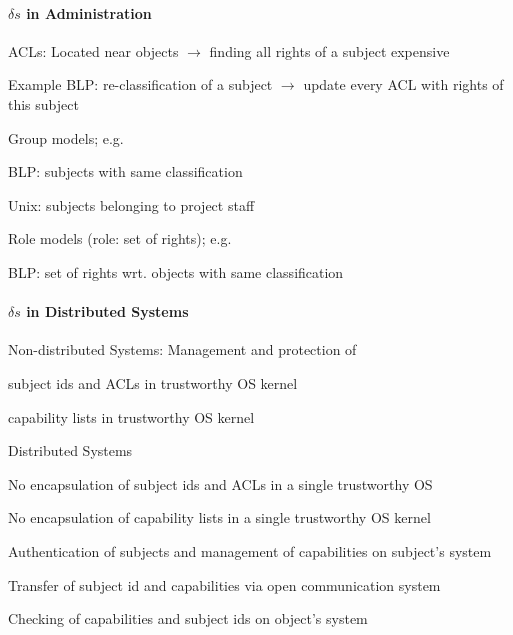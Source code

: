\documentclass[a4paper]{article}
\begin{document}
\begin{multicols}{3}
    \paragraph{$\delta s$ in Administration}
    ACLs: Located near objects $\rightarrow$ finding all rights of a subject expensive

    Example BLP: re-classification of a subject $\rightarrow$ update every ACL with rights of this subject

    Group models; e.g.
    \begin{itemize*}
        \item BLP: subjects with same classification
        \item Unix: subjects belonging to project staff
    \end{itemize*}

    Role models (role: set of rights); e.g.
    \begin{itemize*}
        \item BLP: set of rights wrt. objects with same classification
    \end{itemize*}

    \paragraph{$\delta s$ in Distributed Systems}
    Non-distributed Systems: Management and protection of
    \begin{itemize*}
        \item subject ids and ACLs in trustworthy OS kernel
        \item capability lists in trustworthy OS kernel
    \end{itemize*}

    Distributed Systems
    \begin{itemize*}
        \item No encapsulation of subject ids and ACLs in a single trustworthy OS
        \item No encapsulation of capability lists in a single trustworthy OS kernel
        \begin{itemize*}
            \item Authentication of subjects and management of capabilities on subject’s system
            \item Transfer of subject id and capabilities via open communication system
            \item Checking of capabilities and subject ids on object’s system
        \end{itemize*}
    \end{itemize*}


\end{multicols}
\end{document}
